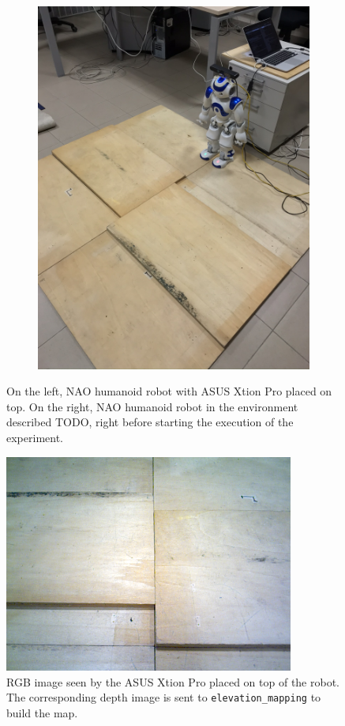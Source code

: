 \begin{figure}
\begin{subfigure}[b]{0.49\textwidth}
    \includegraphics[width=\textwidth]{figures/NAO-with-xtion-full-env.JPEG}
    \caption{}
    \label{fig:nao-with-xtion-full-env}
  \end{subfigure}
  \caption{On the left, NAO humanoid robot with ASUS Xtion Pro placed on top.
      On the right, NAO humanoid robot in the environment described TODO, 
      right before starting the execution of the experiment.}
\end{figure}
\begin{figure}
  \centering
  \includegraphics[width=0.85\textwidth]{figures/xtion_rgb_20cm.png}
  \caption{RGB image seen by the ASUS Xtion Pro placed on top of the robot.
      The corresponding depth image is sent to \texttt{elevation\_mapping}
      to build the map.}
  \label{fig:xtion-rgb-20cm}
\end{figure}
